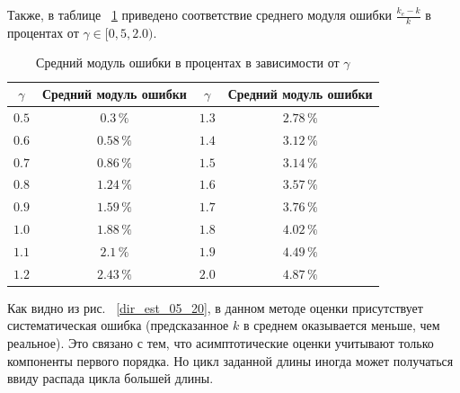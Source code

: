 Также, в таблице ~\ref{tab-est-error} приведено соответствие среднего модуля ошибки $\frac {k_e - k} k$ в процентах от $\gamma \in [0,5, 2.0)$.

\begin{table}[!h]
  \caption{Средний модуль ошибки в процентах в зависимости от $\gamma$}\label{tab1}
  \centering
  \begin{tabular}{|*{4}{c|}}\hline
  \( \gamma \) & Средний модуль ошибки & \( \gamma \) & Средний модуль ошибки \\\hline
  $0.5$ & $0.3 \, \%$ & $1.3$ & $2.78 \, \%$ \\\hline
  $0.6$ & $0.58 \, \%$ & $1.4$ & $3.12 \, \%$ \\\hline
  $0.7$ & $0.86 \, \%$ & $1.5$ & $3.14 \, \%$ \\\hline
  $0.8$ & $1.24 \, \%$ & $1.6$ & $3.57 \, \%$ \\\hline
  $0.9$ & $1.59 \, \%$ & $1.7$ & $3.76 \, \%$ \\\hline
  $1.0$ & $1.88 \, \%$ & $1.8$ & $4.02 \, \%$ \\\hline
  $1.1$ & $2.1 \, \%$ & $1.9$ & $4.49 \, \%$ \\\hline
  $1.2$ & $2.43 \, \%$ & $2.0$ & $4.87 \, \%$ \\\hline
  \end{tabular}
  \label{tab-est-error}
\end{table}

Как видно из рис. ~\ref{dir_est_05_20}, в данном методе оценки присутствует систематическая ошибка (предсказанное $k$ в среднем оказывается меньше, чем реальное).
Это связано с тем, что асимптотические оценки учитывают только компоненты первого порядка.
Но цикл заданной длины иногда может получаться ввиду распада цикла большей длины.

